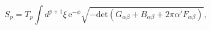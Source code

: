 \begin{equation}
S_p
   = T_p \int d^{p+1}\xi\, \mathrm{e}^{-\phi}
       \sqrt{-\mathrm{det}( G_{\alpha\beta}
                           +B_{\alpha\beta}
                           +2\pi\alpha' F_{\alpha\beta})}, 
\end{equation}

